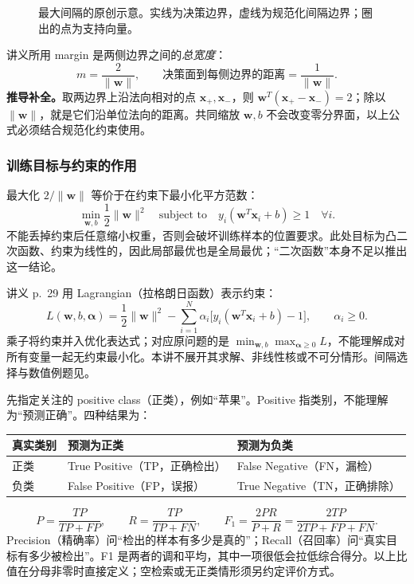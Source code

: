\begin{figure}[htbp]
  \centering
  
  \caption{最大间隔的原创示意。实线为决策边界，虚线为规范化间隔边界；圈出的点为支持向量。}
  \label{fig:sc4061-l10-svm}
\end{figure}

讲义所用 margin 是两侧边界之间的\emph{总宽度}：
\[
  \boxed{m=\frac{2}{\|\bm w\|}},
  \qquad
  \text{决策面到每侧边界的距离}=\frac{1}{\|\bm w\|}.
\]
\textbf{推导补全。}取两边界上沿法向相对的点 $\bm x_+,\bm x_-$，则
$\bm w^T(\bm x_+-\bm x_-)=2$；除以 $\|\bm w\|$，就是它们沿单位法向的距离。共同缩放 $\bm w,b$ 不会改变零分界面，以上公式必须结合规范化约束使用。

\subsubsection*{训练目标与约束的作用}

最大化 $2/\|\bm w\|$ 等价于在约束下最小化平方范数：
\[
  \boxed{
  \min_{\bm w,b}\frac12\|\bm w\|^2
  \quad\text{subject to}\quad
  y_i(\bm w^T\bm x_i+b)\geq1\quad\forall i.
  }
\]
不能丢掉约束后任意缩小权重，否则会破坏训练样本的位置要求。此处目标为凸二次函数、约束为线性的，因此局部最优也是全局最优；“二次函数”本身不足以推出这一结论。

讲义 p.~29 用 Lagrangian（拉格朗日函数）表示约束：
\[
  L(\bm w,b,\bm\alpha)
  =\frac12\|\bm w\|^2
   -\sum_{i=1}^{N}\alpha_i
       \bigl[y_i(\bm w^T\bm x_i+b)-1\bigr],
  \qquad \alpha_i\geq0.
\]
乘子将约束并入优化表达式；对应原问题的是
$\min_{\bm w,b}\max_{\bm\alpha\geq0}L$，不能理解成对所有变量一起无约束最小化。本讲不展开其求解、非线性核或不可分情形。间隔选择与数值例题见。


先指定关注的 positive class（正类），例如“苹果”。Positive 指类别，不能理解为“预测正确”。四种结果为：
\begin{center}
\begin{tabular}{@{}lll@{}}
  \toprule
  真实类别 & 预测为正类 & 预测为负类 \\
  \midrule
  正类 & True Positive（TP，正确检出） & False Negative（FN，漏检）\\
  负类 & False Positive（FP，误报） & True Negative（TN，正确排除）\\
  \bottomrule
\end{tabular}
\end{center}
\[
  \boxed{P=\frac{TP}{TP+FP}},\qquad
  \boxed{R=\frac{TP}{TP+FN}},\qquad
  \boxed{F_1=\frac{2PR}{P+R}
              =\frac{2TP}{2TP+FP+FN}}.
\]
Precision（精确率）问“检出的样本有多少是真的”；Recall（召回率）问“真实目标有多少被检出”。F1 是两者的调和平均，其中一项很低会拉低综合得分。以上比值在分母非零时直接定义；空检索或无正类情形须另约定评价方式。

